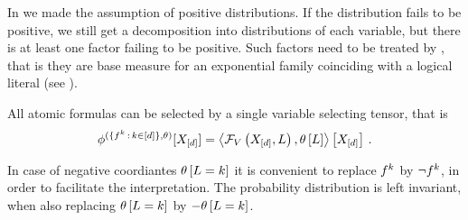 
In  we made the assumption of positive distributions.
If the distribution fails to be positive, we still get a decomposition into distributions of each variable, but there is at least one factor failing to be positive.
Such factors need to be treated by \HybridLogicNetworks{}, that is they are base measure for an exponential family coinciding with a logical literal (see ).

All atomic formulas can be selected by a single variable selecting tensor, that is
\[ \phi^{(\{f^{k} \,:\, k\in[d]\},\theta)}[X_{[d]}]
= \left\langle \mathcal{F}_{V}\left(X_{[d]},L\right),\theta\left[L\right]\right\rangle \left[ X_{[d]} \right] \, .
\]

In case of negative coordiantes $\theta\left[L=k\right]$ it is convenient to replace $f^{k}$ by $\lnot f^{k}$, in order to facilitate the interpretation.
The probability distribution is left invariant, when also replacing $\theta\left[L=k\right]$ by $-\theta\left[L=k\right]$.



\label{sec:boltzmannMachines}

